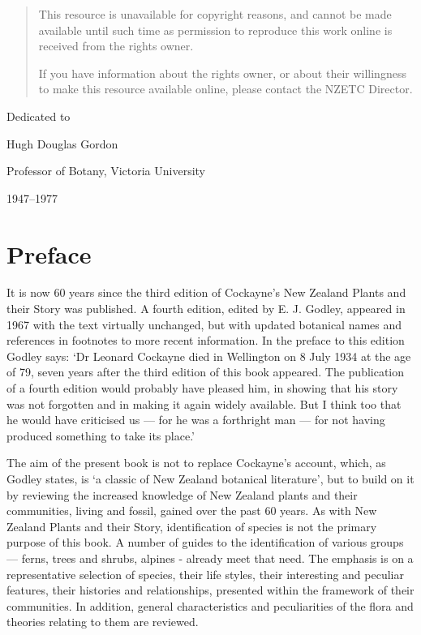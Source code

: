 \begin{quote}
    This resource is unavailable for copyright reasons, and cannot be made available until such time as permission to reproduce this work online is received from the rights owner.

    If you have information about the rights owner, or about their willingness to make this resource available online, please contact the NZETC Director.
\end{quote}

Dedicated to\par
Hugh Douglas Gordon\par
Professor of Botany, Victoria University\par
1947–1977

\chapter*{Preface}

It is now 60 years since the third edition of Cockayne's New Zealand Plants and their Story was published. A fourth edition, edited by E. J. Godley, appeared in 1967 with the text virtually unchanged, but with updated botanical names and references in footnotes to more recent information. In the preface to this edition Godley says: `Dr Leonard Cockayne died in Wellington on 8 July 1934 at the age of 79, seven years after the third edition of this book appeared. The publication of a fourth edition would probably have pleased him, in showing that his story was not forgotten and in making it again widely available. But I think too that he would have criticised us — for he was a forthright man — for not having produced something to take its place.'

The aim of the present book is not to replace Cockayne's account, which, as Godley states, is `a classic of New Zealand botanical literature', but to build on it by reviewing the increased knowledge of New Zealand plants and their communities, living and fossil, gained over the past 60 years. As with New Zealand Plants and their Story, identification of species is not the primary purpose of this book. A number of guides to the identification of various groups — ferns, trees and shrubs, alpines - already meet that need. The emphasis is on a representative selection of species, their life styles, their interesting and peculiar features, their histories and relationships, presented within the framework of their communities. In addition, general characteristics and peculiarities of the flora and theories relating to them are reviewed.

